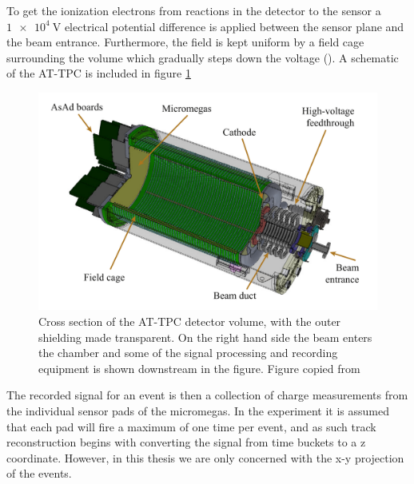  To get the ionization electrons from reactions in the detector to the sensor a $\SI{1e4}{\volt}$ electrical potential difference is applied between the sensor plane and the beam entrance. Furthermore, the field is kept uniform by a field cage surrounding the volume which gradually steps down the voltage (\cite{Bradt2017a}). A schematic of the AT-TPC is included in figure \ref{fig:attpc_schematic}

 \begin{figure}
 \centering
 \includegraphics[width=\textwidth]{../plots/at_tpc_schematic}
 \caption[AT-TPC cross-section]{Cross section of the AT-TPC detector volume, with the outer shielding made transparent. On the right hand side the beam enters the chamber and some of the signal processing and recording equipment is shown downstream in the figure. Figure copied from \cite{Bradt2017a}}\label{fig:attpc_schematic}
 \end{figure}

The recorded signal for an event is then a collection of charge measurements from the individual sensor pads of the micromegas. In the experiment it is assumed that each pad will fire a maximum of one time per event, and as such track reconstruction begins with converting the signal from time buckets to a z coordinate. However, in this thesis we are only concerned with the x-y projection of the events. 
